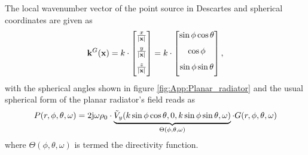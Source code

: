 The local wavenumber vector of the point source in Descartes and spherical coordinates are given as
\begin{equation}
\mathbf{k}^G(\mathbf{x}) = 
k \cdot \begin{bmatrix} \frac{x}{|\mathbf{x}|}  \\[.7em] \frac{y}{|\mathbf{x}|} \\[.7em] \frac{z}{|\mathbf{x}|}\\[0.5em]  \end{bmatrix}
=
k \cdot \begin{bmatrix} \sin \phi \cos \theta \\[.7em] \cos \phi  \\[.7em]  \sin \phi \sin \theta \\[0.5em]  \end{bmatrix},
\label{Eq:App:ps_k_vec}
\end{equation}
with the spherical angles shown in figure \ref{fig:App:Planar_radiator} and the usual spherical form of the planar radiator's field reads as
\begin{equation}
P(r,\phi,\theta,\omega) = 
2 \mathrm{j} \omega \rho_0 \cdot \underbrace{\tilde{V}_{y}(k \sin \phi \cos \theta ,0,k \sin \phi \sin \theta ,\omega) }_{\Theta(\phi,\theta,\omega)}
\cdot G(r,\phi,\theta,\omega) 
\label{Eq:App:directive_monopole}
\end{equation}
where $\Theta(\phi,\theta,\omega)$ is termed the directivity function.

